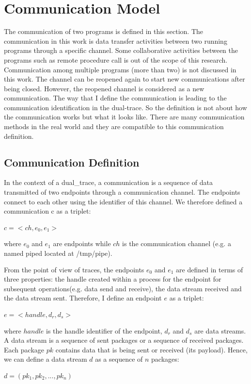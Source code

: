\section{Communication Model}\label{definition}
The communication of two programs is defined in this section. The communication in this work is data transfer activities between two running programs through a specific channel. Some collaborative activities between the programs such as remote procedure call is out of the scope of this research. Communication among multiple programs (more than two) is not discussed in this work. The channel can be reopened again to start new communications after being closed. However, the reopened channel is considered as a new communication. The way that I define the communication is leading to the communication identification in the dual-trace. So the definition is not about how the communication works but what it looks like. There are many communication methods in the real world and they are compatible to this communication definition. 

\subsection{Communication Definition}
In the context of a dual\_trace, a communication is a sequence of data transmitted of two endpoints through a communication channel. The endpoints connect to each other using the identifier of this channel. We therefore defined a communication c as a triplet:

$c =<ch, e_0, e_1>$

where $e_0$ and $e_1$ are endpoints while $ch$ is the communication channel (e.g. a named piped located at /tmp/pipe).

From the point of view of traces, the endpoints $e_0$ and $e_1$ are defined in terms of three properties: the handle created within a process for the endpoint for subsequent operations(e.g. data send and receive), the data stream received and the data stream sent. Therefore, I define an endpoint $e$ as a triplet:

$ e =<handle,  d_r, d_s>$

where $handle$ is the handle identifier of the endpoint, $d_r$ and $d_s$ are data streams. A data stream is a sequence of sent packages or a sequence of received packages. Each package $pk$ contains data that is being sent or received (its payload). Hence, we can define a data stream $d$ as a sequence of $n$ packages:

$ d = (pk_1, pk_2, ..., pk_n)$ 


